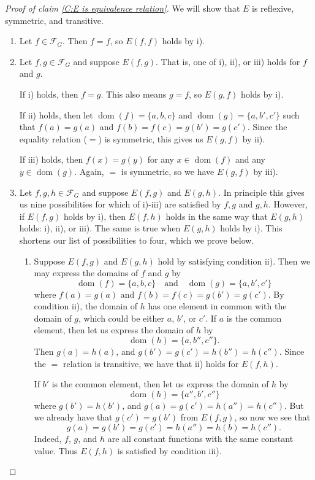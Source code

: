 \documentclass{scrartcl}
\DeclareMathOperator{\dom}{dom}
\newcommand{\SF}{\mathscr{F}}
\begin{document}
\begin{proof}[Proof of claim \ref{C:E is equivalence relation}] We will show that $E$ is reflexive, symmetric, and transitive.

\begin{enumerate}
\item[(Reflexivity)] Let $f\in\SF_G$. Then $f=f$, so $E(f,f)$ holds by i).

\item[(Symmetry)] Let $f,g\in\SF_G$ and suppose $E(f,g)$. That is, one of i), ii), or iii) holds for $f$ and $g$.

If i) holds, then $f=g$. This also means $g=f$, so $E(g,f)$ holds by i).

If ii) holds, then let $\dom(f)=\{a,b,c\}$ and $\dom(g)=\{a,b',c'\}$ such that $f(a)=g(a)$ and $f(b)=f(c)=g(b')=g(c')$. Since the equality relation ($=$) is symmetric, this gives us $E(g,f)$ by ii).

If iii) holds, then $f(x)=g(y)$ for any $x\in\dom(f)$ and any $y\in\dom(g)$. Again, $=$ is symmetric, so we have $E(g,f)$ by iii).

\item[(Transitivity)] Let $f,g,h\in\SF_G$ and suppose $E(f,g)$ and $E(g,h)$. In principle this gives us nine possibilities for which of i)-iii) are satisfied by $f,g$ and $g,h$. However, if $E(f,g)$ holds by i), then $E(f,h)$ holds in the same way that $E(g,h)$ holds: i), ii), or iii). The same is true when $E(g,h)$ holds by i). This shortens our list of possibilities to four, which we prove below.

\begin{enumerate}[(1)]

\item Suppose $E(f,g)$ and $E(g,h)$ hold by satisfying condition ii). Then we may express the domains of $f$ and $g$ by
\[
\dom(f)=\{a,b,c\} \quad \text{and} \quad \dom(g)=\{a,b',c'\}
\]
where $f(a)=g(a)$ and $f(b)=f(c)=g(b')=g(c')$. By condition ii), the domain of $h$ has one element in common with the domain of $g$, which could be either $a$, $b'$, or $c'$. If $a$ is the common element, then let us express the domain of $h$ by
\[
\dom(h)=\{a,b'',c''\}.
\]
Then $g(a)=h(a)$, and $g(b')=g(c')=h(b'')=h(c'')$. Since the $=$ relation is transitive, we have that ii) holds for $E(f,h)$.

If $b'$ is the common element, then let us express the domain of $h$ by
\[
\dom(h)=\{a'',b',c''\}
\]
where $g(b')=h(b')$, and $g(a)=g(c')=h(a'')=h(c'')$. But we already have that $g(c')=g(b')$ from $E(f,g)$, so now we see that 
\[
g(a)=g(b') = g(c') =h(a'')=h(b)=h(c'').
\]
Indeed, $f$, $g$, and $h$ are all constant functions with the same constant value. Thus $E(f,h)$ is satisfied by condition iii).


\end{enumerate}
\end{enumerate}
\end{proof}
\end{document}
